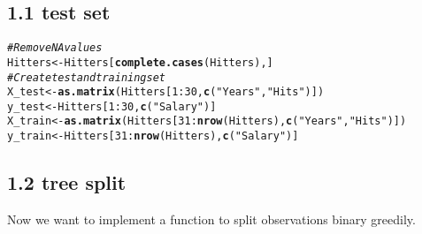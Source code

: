 \documentclass[10pt, a4paper, english]{article}\usepackage[]{graphicx}\usepackage[dvipsnames]{xcolor}
\makeatletter
\newcommand{\hlnum}[1]{\textcolor[rgb]{0.686,0.059,0.569}{#1}}%
\newcommand{\hlstr}[1]{\textcolor[rgb]{0.192,0.494,0.8}{#1}}%
\newcommand{\hlcom}[1]{\textcolor[rgb]{0.678,0.584,0.686}{\textit{#1}}}%
\newcommand{\hlopt}[1]{\textcolor[rgb]{0,0,0}{#1}}%
\newcommand{\hlstd}[1]{\textcolor[rgb]{0.345,0.345,0.345}{#1}}%
\newcommand{\hlkwb}[1]{\textcolor[rgb]{0.69,0.353,0.396}{#1}}%
\newcommand{\hlkwd}[1]{\textcolor[rgb]{0.737,0.353,0.396}{\textbf{#1}}}%
\newenvironment{kframe}{%
 \def\at@end@of@kframe{}%
 \ifinner\ifhmode%
  \def\at@end@of@kframe{\end{minipage}}%
  \begin{minipage}{\columnwidth}%
 \fi\fi%
 \def\FrameCommand##1{\hskip\@totalleftmargin \hskip-\fboxsep
 \colorbox{shadecolor}{##1}\hskip-\fboxsep
     \hskip-\linewidth \hskip-\@totalleftmargin \hskip\columnwidth}%
 \MakeFramed {\advance\hsize-\width
   \@totalleftmargin\z@ \linewidth\hsize
   \@setminipage}}%
 {\par\unskip\endMakeFramed%
 \at@end@of@kframe}
\newenvironment{knitrout}{}{} %
\makeatother
\begin{document}
\subsection{1.1 test set}

\begin{knitrout}
\color{fgcolor}\begin{kframe}
\begin{alltt}
\hlcom{# Remove NA values}
\hlstd{Hitters} \hlkwb{<-} \hlstd{Hitters[}\hlkwd{complete.cases}\hlstd{(Hitters),]}
\hlcom{# Create test and training set}
\hlstd{X_test} \hlkwb{<-} \hlkwd{as.matrix}\hlstd{(Hitters[}\hlnum{1}\hlopt{:}\hlnum{30}\hlstd{,} \hlkwd{c}\hlstd{(}\hlstr{"Years"}\hlstd{,} \hlstr{"Hits"}\hlstd{)])}
\hlstd{y_test} \hlkwb{<-} \hlstd{Hitters[}\hlnum{1}\hlopt{:}\hlnum{30}\hlstd{,} \hlkwd{c}\hlstd{(}\hlstr{"Salary"}\hlstd{)]}
\hlstd{X_train} \hlkwb{<-} \hlkwd{as.matrix}\hlstd{(Hitters[}\hlnum{31}\hlopt{:}\hlkwd{nrow}\hlstd{(Hitters),} \hlkwd{c}\hlstd{(}\hlstr{"Years"}\hlstd{,} \hlstr{"Hits"}\hlstd{)])}
\hlstd{y_train} \hlkwb{<-} \hlstd{Hitters[}\hlnum{31}\hlopt{:}\hlkwd{nrow}\hlstd{(Hitters),} \hlkwd{c}\hlstd{(}\hlstr{"Salary"}\hlstd{)]}
\end{alltt}
\end{kframe}
\end{knitrout}


\subsection{1.2 tree split}
Now we want to implement a function to split observations binary greedily.
\end{document}
